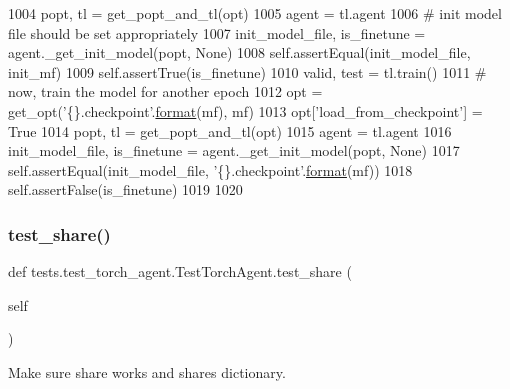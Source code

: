 \begin{DoxyCode}
1004                 popt, tl = get\_popt\_and\_tl(opt)
1005                 agent = tl.agent
1006                 \textcolor{comment}{# init model file should be set appropriately}
1007                 init\_model\_file, is\_finetune = agent.\_get\_init\_model(popt, \textcolor{keywordtype}{None})
1008                 self.assertEqual(init\_model\_file, init\_mf)
1009                 self.assertTrue(is\_finetune)
1010                 valid, test = tl.train()
1011                 \textcolor{comment}{# now, train the model for another epoch}
1012                 opt = get\_opt(\textcolor{stringliteral}{'\{\}.checkpoint'}.\hyperlink{namespaceparlai_1_1chat__service_1_1services_1_1messenger_1_1shared__utils_a32e2e2022b824fbaf80c747160b52a76}{format}(mf), mf)
1013                 opt[\textcolor{stringliteral}{'load\_from\_checkpoint'}] = \textcolor{keyword}{True}
1014                 popt, tl = get\_popt\_and\_tl(opt)
1015                 agent = tl.agent
1016                 init\_model\_file, is\_finetune = agent.\_get\_init\_model(popt, \textcolor{keywordtype}{None})
1017                 self.assertEqual(init\_model\_file, \textcolor{stringliteral}{'\{\}.checkpoint'}.\hyperlink{namespaceparlai_1_1chat__service_1_1services_1_1messenger_1_1shared__utils_a32e2e2022b824fbaf80c747160b52a76}{format}(mf))
1018                 self.assertFalse(is\_finetune)
1019 
1020 
\end{DoxyCode}
\mbox{\label{classtests_1_1test__torch__agent_1_1TestTorchAgent_af3d1c7681a30a06684117464ccefb15d}} 
\subsubsection{\texorpdfstring{test\+\_\+share()}{test\_share()}}
{\footnotesize\ttfamily def tests.\+test\+\_\+torch\+\_\+agent.\+Test\+Torch\+Agent.\+test\+\_\+share (\begin{DoxyParamCaption}\item[{}]{self }\end{DoxyParamCaption})}

\begin{DoxyVerb}Make sure share works and shares dictionary.
\end{DoxyVerb}
 

